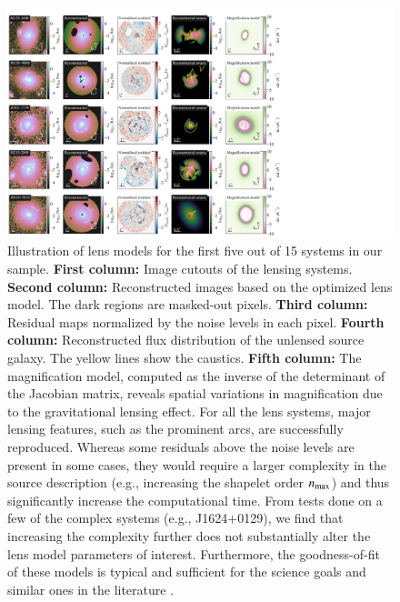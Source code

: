 \documentclass{aa}
\begin{document}
\begin{figure}
	\centering
	\includegraphics[width=1.4\textwidth]{figures/lens_models_0.pdf}
	\caption{\label{fig:lens_models_0}
Illustration of lens models for the first five out of 15 systems in our sample. \textbf{First column:} Image cutouts of the lensing systems. \textbf{Second column:} Reconstructed images based on the optimized lens model. The dark regions are masked-out pixels. \textbf{Third column:} Residual maps normalized by the noise levels in each pixel. \textbf{Fourth column:} Reconstructed flux distribution of the unlensed source galaxy. The yellow lines show the caustics. \textbf{Fifth column:} The magnification model, computed as the inverse of the determinant of the Jacobian matrix, reveals spatial variations in magnification due to the gravitational lensing effect. For all the lens systems, major lensing features, such as the prominent arcs, are successfully reproduced. Whereas some residuals above the noise levels are present in some cases, they would require a larger complexity in the source description (e.g., increasing the shapelet order $n_{\rm max}$) and thus significantly increase the computational time. From tests done on a few of the complex systems (e.g., J1624$+$0129), we find that increasing the complexity further does not substantially alter the lens model parameters of interest. Furthermore, the goodness-of-fit of these models is typical and sufficient for the science goals and similar ones in the literature \citep[\textit{cf.},][]{Shajib21}.
	}
\end{figure}
\end{document}
